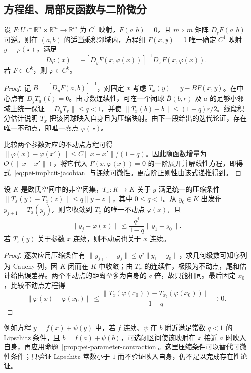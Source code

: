 \subsection{方程组、局部反函数与二阶微分}

\begin{theorem}
\label{thm:pei-system-implicit}
设 $F:U\subset\mathbb R^n\times\mathbb R^m\to\mathbb R^m$ 为 $C^1$ 映射，$F(a,b)=0$，且 $m\times m$ 矩阵 $D_yF(a,b)$ 可逆。则在 $(a,b)$ 的适当乘积邻域内，方程组 $F(x,y)=0$ 唯一确定 $C^1$ 映射 $y=\varphi(x)$，满足
\begin{equation}
\label{eq:pei-implicit-jacobian}
D\varphi(x)=-[D_yF(x,\varphi(x))]^{-1}D_xF(x,\varphi(x)).
\end{equation}
若 $F\in C^k$，则 $\varphi\in C^k$。
\end{theorem}
\begin{proof}
记 $B=[D_yF(a,b)]^{-1}$，对固定 $x$ 考虑 $T_x(y)=y-BF(x,y)$。在中心点有 $D_yT_a(b)=0$。由导数连续性，可在一个闭球 $\overline B(b,r)$ 及 $a$ 的足够小邻域上统一保证 $\|D_yT_x\|\le q<1$，并使 $\|T_x(b)-b\|\le(1-q)r/2$。线段积分估计说明 $T_x$ 把该闭球映入自身且为压缩映射。由下一段给出的迭代论证，存在唯一不动点，即唯一零点 $\varphi(x)$。

比较两个参数对应的不动点方程可得 $\|\varphi(x)-\varphi(x')\|\le C\|x-x'\|/(1-q)$。因此隐函数增量为 $O(\|x-x'\|)$，将它代入 $F(x,\varphi(x))=0$ 的一阶展开并解线性方程，即得式~\eqref{eq:pei-implicit-jacobian} 与连续可微性。更高阶正则性由该式递推得到。
\end{proof}

\begin{proposition}
\label{prop:pei-parameter-contraction}
设 $K$ 是欧氏空间中的非空闭集，$T_x:K\to K$ 关于 $y$ 满足统一的压缩条件 $\|T_x(y)-T_x(z)\|\le q\|y-z\|$，其中 $0\le q<1$。从 $y_0\in K$ 出发作 $y_{j+1}=T_x(y_j)$，则它收敛到 $T_x$ 的唯一不动点 $\varphi(x)$，且
\[
\|y_j-\varphi(x)\|\le\frac{q^j}{1-q}\|y_1-y_0\|.
\]
若 $T_x(y)$ 关于参数 $x$ 连续，则不动点也关于 $x$ 连续。
\end{proposition}
\begin{proof}
逐次应用压缩条件有 $\|y_{j+1}-y_j\|\le q^j\|y_1-y_0\|$，求几何级数可知序列为 Cauchy 列，因 $K$ 闭而在 $K$ 中收敛；由 $T_x$ 的连续性，极限为不动点，尾和估计给出误差界。两个不动点的距离至多为自身的 $q$ 倍，故只能相同。最后固定 $x_0$，比较不动点方程得
\[
\|\varphi(x)-\varphi(x_0)\|\le\frac{\|T_x(\varphi(x_0))-T_{x_0}(\varphi(x_0))\|}{1-q}\longrightarrow0.
\]
\end{proof}

例如方程 $y=f(x)+\psi(y)$ 中，若 $f$ 连续、$\psi$ 在 $b$ 附近满足常数 $q<1$ 的 Lipschitz 条件，且 $b=f(a)+\psi(b)$，可选闭区间使该映射在 $x$ 接近 $a$ 时映入自身，再应用命题~\ref{prop:pei-parameter-contraction}。这里压缩条件可以替代可微性条件；只验证 Lipschitz 常数小于 $1$ 而不验证映入自身，仍不足以完成存在性论证。

